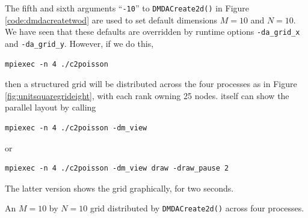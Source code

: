 The fifth and sixth arguments ``\texttt{-10}'' to \texttt{DMDACreate2d()} in Figure \ref{code:dmdacreatetwod} are used to set default dimensions $M=10$ and $N=10$.  We have seen that these defaults are overridden by runtime options \texttt{-da\_grid\_x} and \texttt{-da\_grid\_y}.  However, if we do this,
 \begin{Verbatim}[fontsize=\small]
  mpiexec -n 4 ./c2poisson
\end{Verbatim}
then a structured grid will be distributed across the four processes as in Figure \ref{fig:unitsquaregrideight}, with each rank owning 25 nodes.  \PETSc itself can show the parallel layout by calling
\begin{Verbatim}[fontsize=\small]
  mpiexec -n 4 ./c2poisson -dm_view
\end{Verbatim}
or
\begin{Verbatim}[fontsize=\small]
  mpiexec -n 4 ./c2poisson -dm_view draw -draw_pause 2
\end{Verbatim}
The latter version shows the grid graphically, for two seconds.

\begin{marginfigure}
\caption{An $M=10$ by $N=10$ grid distributed by \texttt{DMDACreate2d()} across four \MPI processes.}
\label{fig:unitsquaregrideight}
\end{marginfigure}

